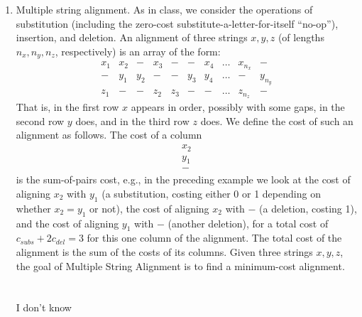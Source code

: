 \documentclass[12pt]{article}
\begin{document}
\renewcommand{\headrulewidth}{0.5pt}
\phantom{Test}

\vspace{-3mm}
\begin{enumerate}
		 
\item Multiple string alignment. As in class, we consider the operations of substitution (including the zero-cost substitute-a-letter-for-itself ``no-op''), insertion, and deletion. An alignment of three strings $x,y,z$ (of lengths $n_x, n_y, n_z$, respectively) is an array of the form:
\[
\begin{array}{cccccccccc}
x_1 & x_2 & - & x_3 & - & - & x_4 & \dotsc & x_{n_x} & - \\
- & y_1 & y_2 & - & - & y_3 & y_4 & \dotsc & - & y_{n_y} \\
z_1 & - & - & z_2 & z_3 & - & - & \dotsc & z_{n_z} & -
\end{array}
\]
That is, in the first row $x$ appears in order, possibly with some gaps, in the second row $y$ does, and in the third row $z$ does. We define the cost of such an alignment as follows. The cost of a column
\[
\begin{array}{c}
x_2 \\
y_1 \\
-
\end{array}
\] 
is the sum-of-pairs cost, e.g., in the preceding example we look at the cost of aligning $x_2$ with $y_1$ (a substitution, costing either 0 or 1 depending on whether $x_2 = y_1$ or not), the cost of aligning $x_2$ with $-$ (a deletion, costing 1), and the cost of aligning $y_1$ with $-$ (another deletion), for a total cost of $c_{subs} + 2 c_{del} = 3$ for this one column of the alignment. The total cost of the alignment is the sum of the costs of its columns. Given three strings $x,y,z$, the goal of Multiple String Alignment is to find a minimum-cost alignment.
\\ \\ \\ I don't know
\pagebreak


\end{enumerate}
\end{document}
